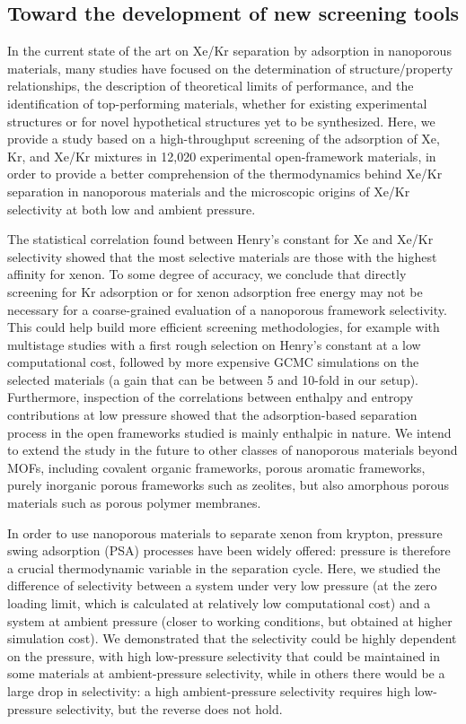 \documentclass[main.tex]{subfiles}
\begin{document}
\subsection{Toward the development of new screening tools}

In the current state of the art on Xe/Kr separation by adsorption in nanoporous materials, many studies have focused on the determination of structure/property relationships, the description of theoretical limits of performance, and the identification of top-performing materials, whether for existing experimental structures or for novel hypothetical structures yet to be synthesized. Here, we provide a study based on a high-throughput screening of the adsorption of Xe, Kr, and Xe/Kr mixtures in 12,020 experimental open-framework materials, in order to provide a better comprehension of the thermodynamics behind Xe/Kr separation in nanoporous materials and the microscopic origins of Xe/Kr selectivity at both low and ambient pressure. 

The statistical correlation found between Henry's constant for Xe and Xe/Kr selectivity showed that the most selective materials are those with the highest affinity for xenon. To some degree of accuracy, we conclude that directly screening for Kr adsorption or for  xenon adsorption free energy may not be necessary for a coarse-grained evaluation of a nanoporous framework selectivity. This could help build more efficient screening methodologies, for example with multistage studies with a first rough selection on Henry's constant at a low computational cost, followed by more expensive GCMC simulations on the selected materials (a gain that can be between 5 and 10-fold in our setup). Furthermore, inspection of the correlations between enthalpy and entropy contributions at low pressure showed that the adsorption-based separation process in the open frameworks studied is mainly enthalpic in nature. We intend to extend the study in the future to other classes of nanoporous materials beyond MOFs, including covalent organic frameworks, porous aromatic frameworks, purely inorganic porous frameworks such as zeolites, but also amorphous porous materials such as porous polymer membranes.

In order to use nanoporous materials to separate xenon from krypton, pressure swing adsorption (PSA) processes have been widely offered: pressure is therefore a crucial thermodynamic variable in the separation cycle. Here, we studied the difference of selectivity between a system under very low pressure (at the zero loading limit, which is calculated at relatively low computational cost) and a system at ambient pressure (closer to working conditions, but obtained at higher simulation cost). We demonstrated that the selectivity could be highly dependent on the pressure, with high low-pressure selectivity that could be maintained in some materials at ambient-pressure selectivity, while in others there would be a large drop in selectivity: a high ambient-pressure selectivity requires high low-pressure selectivity, but the reverse does not hold.
\end{document}
